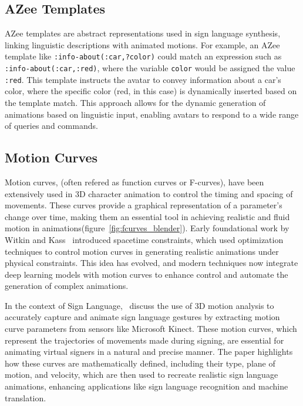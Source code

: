 \documentclass[../../main.tex]{subfiles}
\begin{document}
\subsection{AZee Templates}
\label{ch:intermediate_blocks:related_work:azee_templates}

AZee templates are abstract representations used in sign language synthesis, linking linguistic descriptions with animated motions. For example, an AZee template like \texttt{:info-about(:car,?color)} could match an expression such as \texttt{:info-about(:car,:red)}, where the variable \texttt{color} would be assigned the value \texttt{:red}. This template instructs the avatar to convey information about a car's color, where the specific color (red, in this case) is dynamically inserted based on the template match. This approach allows for the dynamic generation of animations based on linguistic input, enabling avatars to respond to a wide range of queries and commands.

\subsection{Motion Curves}
\label{ch:intermediate_blocks:related_work:motion_curves}

Motion curves, (often refered as function curves or F-curves), have been extensively used in 3D character animation to control the timing and spacing of movements. These curves provide a graphical representation of a parameter's change over time, making them an essential tool in achieving realistic and fluid motion in animations(figure~\ref{fig:fcurves_blender}). Early foundational work by Witkin and Kass~\cite{witkin1988spacetime} introduced spacetime constraints, which used optimization techniques to control motion curves in generating realistic animations under physical constraints. This idea has evolved, and modern techniques now integrate deep learning models with motion curves to enhance control and automate the generation of complex animations.

In the context of Sign Language,~\cite{inproceedings} discuss the use of 3D motion analysis to accurately capture and animate sign language gestures by extracting motion curve parameters from sensors like Microsoft Kinect. These motion curves, which represent the trajectories of movements made during signing, are essential for animating virtual signers in a natural and precise manner. The paper highlights how these curves are mathematically defined, including their type, plane of motion, and velocity, which are then used to recreate realistic sign language animations, enhancing applications like sign language recognition and machine translation.
\end{document}
